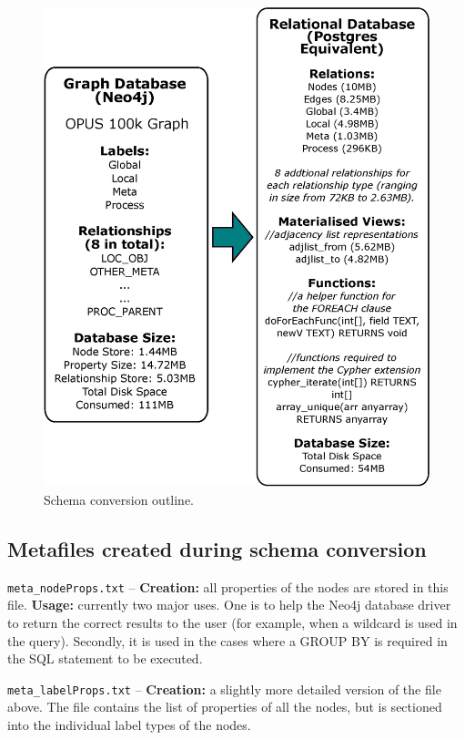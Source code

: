 \documentclass[letterpaper]{ltxdoc}
\begin{document}
\begin{figure}[p]
\centerline{\includegraphics[width=\textwidth,height=\textheight,keepaspectratio]{schemaConv.eps}}
\caption{Schema conversion outline.}
\label{schemaConv}
\end{figure}

\subsection{Metafiles created during schema conversion}
\label{ssec:meta}
\texttt{meta\_nodeProps.txt} -- \textbf{Creation:} all properties of the nodes are stored in this file. \textbf{Usage:} currently two major uses. One is to help the Neo4j database driver to return the correct results to the user (for example, when a wildcard is used in the query). Secondly, it is used in the cases where a GROUP BY is required in the SQL statement to be executed.

\bigskip

\texttt{meta\_labelProps.txt} -- \textbf{Creation:} a slightly more detailed version of the file above. The file contains the list of properties of all the nodes, but is sectioned into the individual label types of the nodes.
\end{document}
